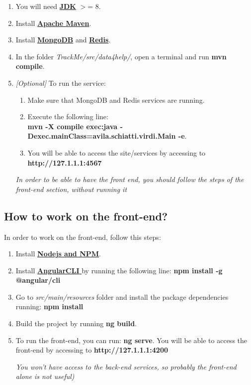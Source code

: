\documentclass[a4paper, hidelinks, 12pt]{report}
\begin{document}
	\begin{enumerate}
	\item You will need \href{https://www.oracle.com/technetwork/java/javase/downloads/index.html}{\textbf{JDK}}  $>$= 8.
	\item Install \href{https://maven.apache.org/what-is-maven.html}{\textbf{Apache Maven}}. 
	\item Install \href{https://docs.mongodb.com/manual/installation/}{\textbf{MongoDB}}  and \href{https://redis.io/download}{\textbf{Redis}}.
	\item In the folder \textit{TrackMe/src/data4help/}, open a terminal and run \textbf{mvn compile}.
	\item \textit{[Optional]} To run the service:
		\begin{enumerate}
		\item Make sure that MongoDB and Redis services are running.
		\item Execute the following line:\\
		\textbf{ mvn -X compile exec:java -Dexec.mainClass=avila.schiatti.virdi.Main -e}.
		\item You will be able to access the site/services by accessing to \textbf{http://127.1.1.1:4567}
		\end{enumerate}
	
	\textit{	In order to be able to have the front end, you should follow the steps of the front-end section, without running it}	
	\end{enumerate}
	
	\subsection{How to work on the front-end?}
	In order to work on the front-end, follow this steps:

	\begin{enumerate}
	\item Install \href{https://nodejs.org/es/download/}{\textbf{Nodejs and NPM}}.
	\item Install \href{https://cli.angular.io/}{\textbf{AngularCLI }} by running the following line:\textbf{ npm install -g @angular/cli }
	\item Go to \textit{src/main/resources} folder and install the package dependencies running: \textbf{npm install}
	\item Build the project by running \textbf{ng build}.
	\item To run the front-end, you can run: \textbf{ng serve}. You will be able to access the front-end by accessing to \textbf{http://127.1.1.1:4200} 
	
	\textit{You won't have access to the back-end services, so probably the front-end alone is not useful)}
	\end{enumerate}
	
\end{document}
